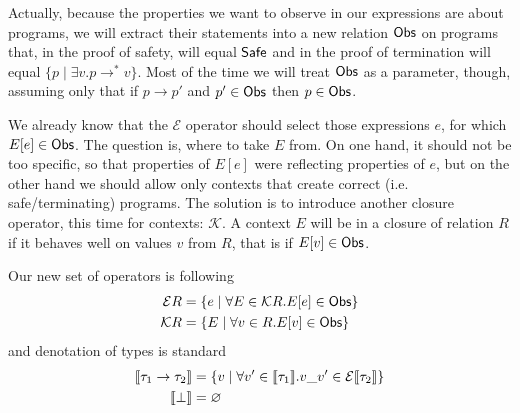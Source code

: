 Actually, because the properties we want to observe in our expressions are about
programs, we will extract their statements into a new relation $\mathsf{Obs}$ on programs
that, in the proof of safety, will equal $\mathsf{Safe}$ and in the proof of
termination will equal $\{ p \mid \exists v. p \longrightarrow^* v\}$. Most of
the time we will treat $\mathsf{Obs}$ as a parameter, though, assuming only that if
$p \longrightarrow p'$ and $p' \in \mathsf{Obs}$ then $p \in \mathsf{Obs}$.

We already know that the $\mathcal{E}$ operator should select those expressions $e$,
for which $E[e] \in \mathsf{Obs}$. The question is, where to take $E$ from. On one hand,
it should not be too specific, so that properties of $E[e]$ were reflecting
properties of $e$, but on the other hand we should allow only contexts that
create correct (i.e. safe/terminating) programs. The solution is to introduce
another closure operator, this time for contexts: $\mathcal{K}$. A context $E$
will be in a closure of relation $R$ if it behaves well on values $v$ from $R$,
that is if $E[v] \in \mathsf{Obs}$.

Our new set of operators is following
\begin{alignat*}{2}
  \mathcal{E}R &= \{ e \mid \forall E \in \mathcal{K} R. E[e] \in \mathsf{Obs} \} \\
  \mathcal{K}R &= \{ E \mid \forall v \in R. E[v] \in \mathsf{Obs} \}
\end{alignat*}
and denotation of types is standard
\begin{alignat*}{2}
  \llbracket\tau_1 \to \tau_2\rrbracket &= \{ v \mid \forall v' \in \llbracket\tau_1\rrbracket. v\_v' \in \mathcal{E}\llbracket\tau_2\rrbracket \} \\
  \llbracket\bot\rrbracket &= \varnothing
\end{alignat*}

